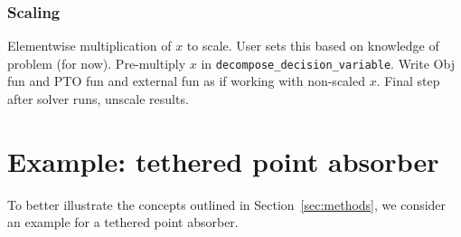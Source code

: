 \documentclass[]{article}
\begin{document}
\subsubsection{Scaling}\label{sec:scaling}

Elementwise multiplication of $x$ to scale.
User sets this based on knowledge of problem (for now).
Pre-multiply $x$ in \texttt{decompose\_decision\_variable}.
Write Obj fun and PTO fun and external fun as if working with non-scaled $x$.
Final step after solver runs, unscale results.

\section{Example: tethered point absorber}\label{sec:example_tethered_point_absorber}

To better illustrate the concepts outlined in Section~\ref{sec:methods}, we consider an example for a tethered point absorber.

\end{document}
